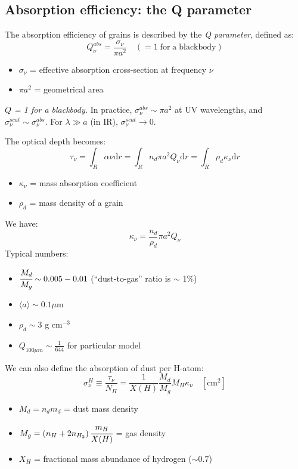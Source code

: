 \documentclass[11pt]{article}
\newcommand{\mar}[1]{\hspace{0pt}\marginpar{-\textcolor{black}{#1}-}}
\newcommand{\mynotes}[1]{{\fontfamily{cmss}\selectfont \textit{#1}}}
\begin{document}
\subsection{Absorption efficiency: the Q parameter}
The absorption efficiency of grains is described by the \textit{Q parameter},
defined as:
\[
    Q_{\nu}^{abs}
    = \frac{\sigma_{\nu}}{{\pi}a^{2}}
    \quad
    (= 1 \;\mathrm{for\;a\;blackbody})
    \]
\begin{itemize}[label={}]
    \item $\sigma_{\nu}$ = effective absorption cross-section at frequency
        $\nu$
    \item ${\pi}a^{2}$ = geometrical area
\end{itemize}
\mynotes{$Q$ = 1 for a blackbody.}
In practice, $\sigma_{\nu}^{abs} \sim {\pi}a^{2} $
at UV wavelengths, and $\sigma_{\nu}^{scat} \sim \sigma_{\nu}^{abs}$.
For $\lambda \gg a$ (in IR), $\sigma_{\nu}^{scat} \rightarrow 0$.

\mar{106}The optical depth becomes:
\[
    \tau_{\nu}
    = \int_{R}{ \alpha{\nu} \mathrm{d}r}
    = \int_{R}{ n_{d} \pi a^{2} Q_{\nu} \mathrm{d}r}
    = \int_{R}{ \rho_{d}\kappa_{\nu} \mathrm{d}r}
    \]
\begin{itemize}
    \item $\kappa_{\nu}$ = mass absorption coefficient
    \item $\rho_{d}$ = mass density of a grain
\end{itemize}
We have:
\[
    \kappa_{\nu} = \frac{n_{d}}{\rho_{d}} \pi a^{2} Q_{\nu}
    \]
Typical numbers:
\begin{itemize}[label={}, itemsep=1ex]
    \item $\cfrac{M_{d}}{M_{g}} \sim 0.005 - 0.01$
        (``dust-to-gas'' ratio is $\sim$ 1\%)
    \item $\langle a \rangle \sim 0.1 \mu$m
    \item $\rho_{d} \sim 3$ g cm$^{-3}$
    \item $Q_{100{\mu}m} \sim \frac{1}{644}$ for particular model
\end{itemize}
We can also define the absorption of dust per H-atom:
\[
    \sigma_{\nu}^{H}
    \equiv \frac{\tau_{\nu}}{N_{H}}
    = \frac{1}{X(H)} \frac{M_{d}}{M_{g}} M_{H} \kappa_{\nu} \quad
    [\mathrm{cm}^{2}]
    \]
\begin{itemize}[label={}, itemsep=1ex]
    \item $M_{d} = n_{d}m_{d}$ = dust mass density
    \item $M_{g} = \left( n_{H} + 2n_{H_{2}} \right)
        \cfrac{m_{H}}{X(H)}$ = gas density
    \item $X_{H}$ = fractional mass abundance of hydrogen ($ \sim 0.7 $)
\end{itemize}
\end{document}
